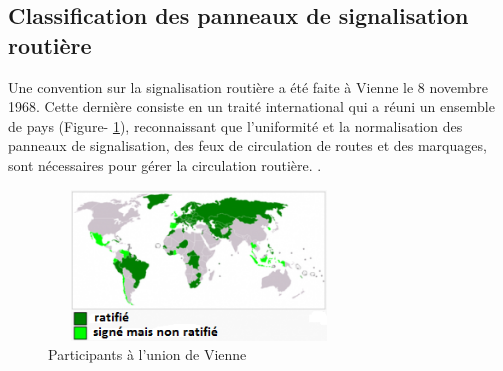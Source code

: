 \subsection{Classification des panneaux de signalisation routière }

Une convention sur la signalisation routière a été faite à Vienne le 8 novembre 1968. Cette dernière consiste en un  traité international qui a réuni un ensemble de pays (Figure- \ref{fig:participants de Viennes}), reconnaissant que l’uniformité et la normalisation des panneaux de signalisation, des feux de circulation de routes et des marquages, sont nécessaires pour gérer la circulation routière. \cite{1}.\\

\begin{figure}[h!]
        \centering
        \includegraphics[width=8cm,height=4cm]{images/vienna.png}
        \caption{Participants à l’union de Vienne}
        \label{fig:participants de Viennes}
\end{figure}
    
